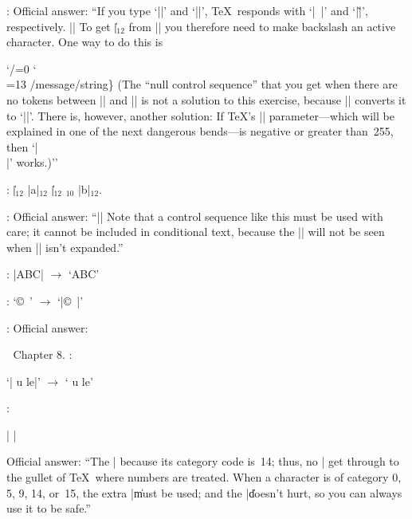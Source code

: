 :
Official answer: ``If you type `|\message{\string~}|' and `|\message{\string\~}|', \TeX\
responds with `|~|' and `|\~|', respectively. |\message|
To get |\|$_{12}$ from |\string| you therefore need to make backslash an
active character. One way to do this is
\begintt
{\catcode`/=0 \catcode`\\=13 /message{/string\}}
\endtt
(The ``{null control sequence}'' that you get when there are no
tokens between |\csname| and |\endcsname| is not a solution to this exercise,
because |\string| converts it to `|\csname\endcsname|'. There is, however,
another solution: If \TeX's |\escapechar| parameter---which will be
explained in one of the next dangerous bends---is negative or greater
than~255, then `|\string\\|' works.)''

:
|\|$_{12}$ |a|$_{12}$ |\|$_{12}$ \]$_{10}$ |b|$_{12}$.

:
Official answer: ``|\def\ifundefined#1{\expandafter\ifx\csname#1\endcsname\relax}|%
\hfil\break Note that a control sequence like this must be used with care;
it cannot be included in {conditional} text, because the |\ifx| will not
be seen when |\ifundefined| isn't expanded.''

:
|\uppercase{a\lowercase{bC}}| $\rightarrow$ `\uppercase{a\lowercase{bC}}'

:
`\copyright\ \uppercase\expandafter{\romannumeral\year}' $\rightarrow$ `|\copyright\ \uppercase\expandafter{\romannumeral\year}|'

:
Official answer:
\begintt
\def\gobble#1{} %
\def\appendroman#1#2#3{\expandafter\def\expandafter#1\expandafter
  {\csname\expandafter\gobble\string#2\romannumeral#3\endcsname}}
\endtt
\myhr
\vfill
\eject


\noindent Chapter 8.
\myhr
{}:

\item\bull `| u le|' $\rightarrow$ ` u le'


\myhr
{}:

|%
|%

Official answer: ``The |%
because its category code is~14; thus, no |%
get through to the gullet of \TeX\ where numbers are treated. When a
character is of category 0, 5, 9, 14, or~15, the extra |\| must be
used; and the |\| doesn't hurt, so you can always use it to be safe.''

}
